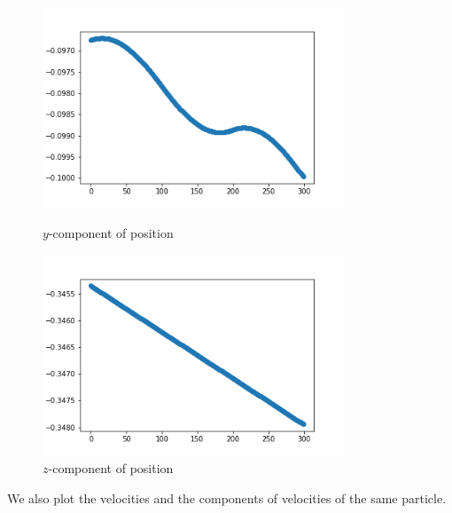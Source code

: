 \documentclass[12pt]{article}
\begin{document}
	\begin{figure}[H]
		\begin{multicols}{2}
			\includegraphics[width=\linewidth, height=6cm]{psy3Bz.png} \caption{$y$-component of position} \label{psy3Bz} \par
			\includegraphics[width=\linewidth, height=6cm]{psz3Bz.png} \caption{$z$-component of position} \label{psz3Bz} \par
		\end{multicols}
	\end{figure}
	\noindent We also plot the velocities and the components of velocities of the same particle.
\end{document}
